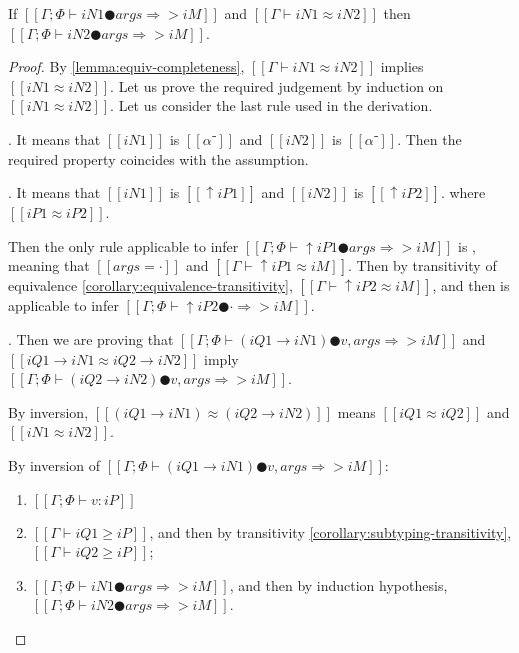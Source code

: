 \begin{lemma} \label{lemma:app-inf-equ-stable}
    If $[[Γ; Φ ⊢ iN1 ● args ⇒> iM]]$ and $[[Γ ⊢ iN1 ≈ iN2]]$ 
    then $[[Γ; Φ ⊢ iN2 ● args ⇒> iM]]$.
\end{lemma}
\begin{proof}
    By \cref{lemma:equiv-completeness}, 
    $[[Γ ⊢ iN1 ≈ iN2]]$ implies $[[iN1 ≈ iN2]]$.
    Let us prove the required judgement by induction on $[[iN1 ≈ iN2]]$.
    Let us consider the last rule used in the derivation.
    \begin{caseof}
        \item {}.
            It means that $[[iN1]]$ is $[[α⁻]]$ and $[[iN2]]$ is $[[α⁻]]$.
            Then the required property coincides with the assumption. 
        \item {}. 
            It means that $[[iN1]]$ is $[[↑iP1]]$ and $[[iN2]]$ is $[[↑iP2]]$.
            where $[[iP1 ≈ iP2]]$.

            Then the only rule applicable to infer $[[Γ; Φ ⊢ ↑iP1 ● args ⇒> iM]]$
            is ,
            meaning that $[[args = ·]]$ and $[[Γ ⊢ ↑iP1 ≈ iM]]$.
            Then by transitivity of equivalence \cref{corollary:equivalence-transitivity},
            $[[Γ ⊢ ↑iP2 ≈ iM]]$, and then  is applicable to infer
            $[[Γ; Φ ⊢ ↑iP2 ● · ⇒> iM]]$.
        
        \item {}.
            Then we are proving that  
            $[[Γ; Φ ⊢ (iQ1 → iN1) ● v, args ⇒> iM]]$ and $[[iQ1 → iN1 ≈ iQ2 → iN2]]$
            imply $[[Γ; Φ ⊢ (iQ2 → iN2) ● v, args ⇒> iM]]$.
            
            By inversion, $[[(iQ1 → iN1) ≈ (iQ2 → iN2)]]$
            means $[[iQ1 ≈ iQ2]]$ and $[[iN1 ≈ iN2]]$.

            By inversion of $[[Γ; Φ ⊢ (iQ1 → iN1) ● v, args ⇒> iM]]$:
            \begin{enumerate}
                \item $[[Γ ; Φ ⊢ v : iP]]$
                \item $[[Γ ⊢ iQ1 ≥ iP]]$,
                    and then by transitivity \cref{corollary:subtyping-transitivity},
                    $[[Γ ⊢ iQ2 ≥ iP]]$;
                \item $[[Γ ; Φ ⊢ iN1 ● args ⇒> iM]]$, 
                    and then by induction hypothesis, $[[Γ ; Φ ⊢ iN2 ● args ⇒> iM]]$.
            \end{enumerate}


\end{caseof}
\end{proof}

